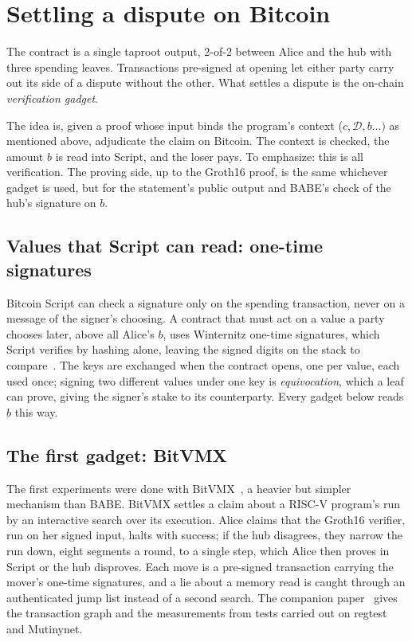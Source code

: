\documentclass[11pt]{article}
\begin{document}
\section{Settling a dispute on Bitcoin}
\label{sec:blocks}

The contract is a single taproot output, 2-of-2 between Alice and the
hub with three spending leaves. Transactions pre-signed at
opening let either party carry out its side of a dispute without the
other. What settles a dispute is the on-chain \emph{verification gadget}.

The idea is, given a proof whose input binds the
program's context ($c , \mathcal{D}, b \ldots )$ as mentioned above, adjudicate the
claim on Bitcoin. The context is checked, the amount $b$ is read into Script, and the loser pays. To emphasize: this is all verification. The proving side, up to the Groth16 proof, is the same whichever gadget is used, but for the statement's public output and BABE's check of the hub's signature on $b$.

\subsection{Values that Script can read: one-time signatures}

Bitcoin Script can check a signature only on the spending transaction,
never on a message of the signer's choosing. A contract that must act on
a value a party chooses later, above all Alice's $b$, uses Winternitz
one-time signatures, which Script verifies by hashing alone, leaving the
signed digits on the stack to compare~\cite{bitvm,bitvmx}. The keys are
exchanged when the contract opens, one per value, each used once;
signing two different values under one key is \emph{equivocation},
which a leaf can prove, giving the signer's stake to its counterparty.
Every gadget below reads $b$ this way.

\subsection{The first gadget: BitVMX}

The first experiments were done with BitVMX~\cite{bitvmx}, a heavier but simpler mechanism than BABE. BitVMX settles a claim about a RISC-V program's run by an
interactive search over its execution. Alice claims that the Groth16
verifier, run on her signed input, halts with success; if the hub
disagrees, they narrow the run down, eight segments a round, to a single
step, which Alice then proves in Script or the hub disproves. Each move
is a pre-signed transaction carrying the mover's one-time signatures,
and a lie about a memory read is caught through an authenticated jump
list instead of a second search. The companion
paper~\cite{lichenbitvmx} gives the transaction graph and the
measurements from tests carried out on regtest and Mutinynet.
\end{document}
